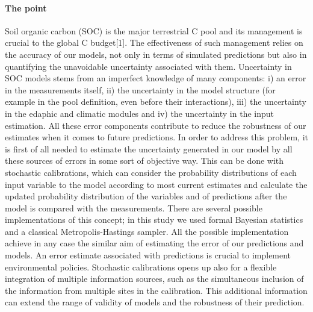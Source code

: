 \documentclass[review]{elsarticle}
\begin{document}
\paragraph{The point} Soil organic carbon (SOC) is the major terrestrial C pool and its management is crucial to the global C budget[1]. The effectiveness of such management relies on the accuracy of our models, not only in terms of simulated predictions but also in quantifying the unavoidable uncertainty associated with them. Uncertainty in SOC models stems from an imperfect knowledge of many components:  i) an error in the measurements itself, ii) the uncertainty in the model structure (for example in the pool definition, even before their interactions), iii) the uncertainty in the edaphic and climatic modules and iv) the uncertainty in the input estimation. All these error components contribute to reduce the robustness of our estimates when it comes to future predictions.
In order to address this problem, it is first of all needed to estimate the uncertainty generated in our model by all these sources of errors in some sort of objective way. This can be done with stochastic calibrations, which can consider the probability distributions of each input variable to the model according to most current estimates and calculate the updated probability distribution of the variables and of predictions after the model is compared with the measurements. There are several possible implementations of this concept; in this study we used formal Bayesian statistics and a classical Metropolis-Hastings sampler. All the possible implementation achieve in any case the similar aim of estimating the error of our predictions and models. An error estimate associated with predictions is crucial to implement environmental policies.
Stochastic calibrations opens up also for a flexible integration of multiple information sources, such as the simultaneous inclusion of the information from multiple sites in the calibration. This additional information can extend the range of validity of models and the robustness of their prediction.
\end{document}
